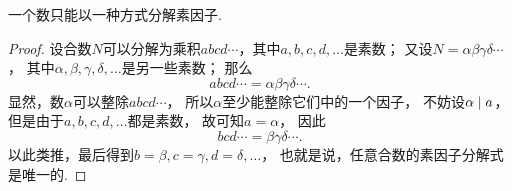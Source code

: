 \begin{theorem}[算数基本定理]
一个数只能以一种方式分解素因子.
\begin{proof}
设合数\(N\)可以分解为乘积\(abcd\dotsm\)，其中\(a,b,c,d,\dotsc\)是素数；
又设\(N = \alpha\beta\gamma\delta\dotsm\)，
其中\(\alpha,\beta,\gamma,\delta,\dotsc\)是另一些素数；
那么\begin{equation*}
	abcd\dotsm = \alpha\beta\gamma\delta\dotsm.
\end{equation*}
显然，数\(\alpha\)可以整除\(abcd\dotsm\)，
所以\(\alpha\)至少能整除它们中的一个因子，
不妨设\(\alpha\mid a\)，
但是由于\(a,b,c,d,\dotsc\)都是素数，
故可知\(a=\alpha\)，
因此\begin{equation*}
	bcd\dotsm = \beta\gamma\delta\dotsm.
\end{equation*}
以此类推，最后得到\(b=\beta,c=\gamma,d=\delta,\dotsc\)，
也就是说，任意合数的素因子分解式是唯一的.
\end{proof}
\end{theorem}

